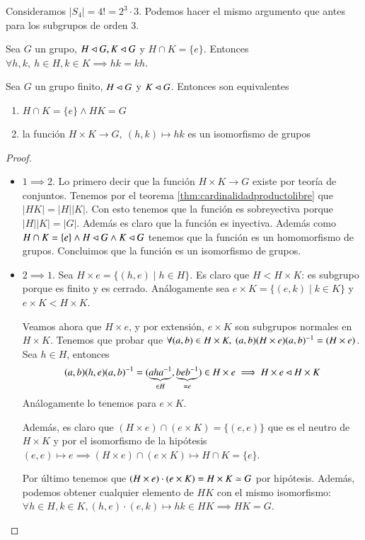 \begin{ej}
	Consideramos $|S_4| = 4! = 2^3 \cdot 3$. Podemos hacer el mismo argumento que antes para los subgrupos de orden 3.
\end{ej}

\begin{pro}
	Sea $G$ un grupo, $H \lhd G, K \lhd G$ y $H \cap K = \{e\}$. Entonces $\forall h, k,\ h \in H, k \in K \implies hk = kh$.
\end{pro}

\begin{thm}
	Sea $G$ un grupo finito, $H \lhd G$ y $K \lhd G$. Entonces son equivalentes
	\begin{enumerate}
		\item $H \cap K = \{e\} \land HK = G$
		\item la función $H \times K \to G,\ (h, k) \mapsto hk$ es un isomorfismo de grupos
	\end{enumerate}
\end{thm}

\begin{proof}$ $\newline
	\begin{itemize}
		\item $1 \implies 2$. Lo primero decir que la función $H\times K \to G$ existe por teoría de conjuntos. Tenemos por el teorema \ref{thm:cardinalidadproductolibre} que $|HK| = |H||K|$. Con esto tenemos que la función es sobreyectiva porque $|H||K| = |G|$. Además es claro que la función es inyectiva. Además como $H\cap K = \{e\} \land H \lhd G \land K \lhd G$ tenemos que la función es un homomorfismo de grupos. Concluimos que la función es un isomorfismo de grupos.
		\item $2 \implies 1$. Sea $H \times e = \{(h, e) \mid h \in H\}$. Es claro que $H < H \times K$: es subgrupo porque es finito y es cerrado. Análogamente sea $e \times K = \{(e, k) \mid k \in K\}$ y $e \times K < H \times K$.
		
		Veamos ahora que $H \times e$, y por extensión, $e \times K$ son subgrupos normales en $H \times K$. Tenemos que probar que $\forall (a,b) \in H \times K,\ (a,b)(H \times e)(a,b)^{-1} = (H \times e)$. Sea $h \in H$, entonces
		\begin{align*}
			(a,b)(h, e)(a,b)^{-1} = (\underbrace{aha^{-1}}_{\in H}, \underbrace{beb^{-1}}_{=e}) \in H \times e \implies H \times e \lhd H \times K
		\end{align*}
		Análogamente lo tenemos para $e \times K$.
		
		Además, es claro que $(H \times e) \cap (e \times K) = \{(e,e)\}$ que es el neutro de $H \times K$ y por el isomorfismo de la hipótesis $(e, e) \mapsto e \implies (H \times e) \cap (e \times K) \mapsto H \cap K = \{e\}$. 
		
		Por último tenemos que $(H \times e) \cdot (e \times K) = H \times K \simeq G$ por hipótesis. Además, podemos obtener cualquier elemento de $HK$ con el mismo isomorfismo: $\forall h \in H, k \in K, (h, e)\cdot(e, k) \mapsto hk \in HK \implies HK = G$.
	\end{itemize}
\end{proof}

